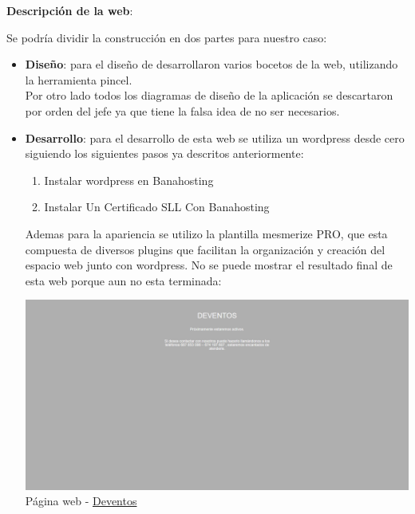 		\textbf{Descripción de la web}:
		
		Se podría dividir la construcción en dos partes para nuestro caso:\\
		
		\begin{itemize}
			\item \textbf{Diseño}: para el diseño de desarrollaron varios bocetos de la web, utilizando la herramienta pincel.\\
			
			Por otro lado todos los diagramas de diseño de la aplicación se descartaron por orden del jefe ya que tiene la falsa idea de no ser necesarios.\\
			
			\item \textbf{Desarrollo}: para el desarrollo de esta web se utiliza un wordpress desde cero siguiendo los siguientes pasos ya descritos anteriormente:
			\begin{enumerate}
				\item Instalar wordpress en Banahosting
				\item Instalar Un Certificado SLL Con Banahosting
			\end{enumerate}
			Ademas para la apariencia se utilizo la plantilla mesmerize PRO, que esta compuesta de diversos plugins que facilitan la organización y creación del espacio web junto con wordpress. No se puede mostrar el resultado final de esta web porque aun no esta terminada:\\ 
			
			\begin{center}
				\includegraphics[scale=0.2]{image/deventos.png}\\
				Página web - \href{https://www.deventos.es/}{Deventos}
			\end{center}
			
			\newpage
			

\end{itemize}
